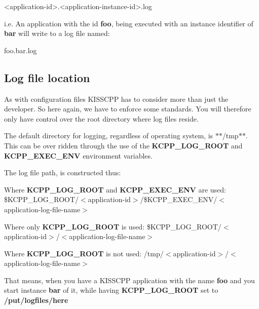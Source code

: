 \begin{DoxyCode}
<application-\textcolor{keywordtype}{id}>.<application-instance-\textcolor{keywordtype}{id}>.log
\end{DoxyCode}


i.\-e. An application with the id {\bfseries foo}, being executed with an instance identifier of {\bfseries bar} will write to a log file named\-:


\begin{DoxyCode}
foo.bar.log
\end{DoxyCode}


\subsection*{Log file location}

As with configuration files K\-I\-S\-S\-C\-P\-P has to consider more than just the developer. So here again, we have to enforce some standards. You will therefore only have control over the root directory where log files reside.

The default directory for logging, regardless of operating system, is $\ast$$\ast$/tmp$\ast$$\ast$. This can be over ridden through the use of the {\bfseries K\-C\-P\-P\-\_\-\-L\-O\-G\-\_\-\-R\-O\-O\-T} and {\bfseries K\-C\-P\-P\-\_\-\-E\-X\-E\-C\-\_\-\-E\-N\-V} environment variables.

The log file path, is constructed thus\-:


\begin{DoxyItemize}
\item Where {\bfseries K\-C\-P\-P\-\_\-\-L\-O\-G\-\_\-\-R\-O\-O\-T} and {\bfseries K\-C\-P\-P\-\_\-\-E\-X\-E\-C\-\_\-\-E\-N\-V} are used\-: \$\-K\-C\-P\-P\-\_\-\-L\-O\-G\-\_\-\-R\-O\-O\-T/$<$application-\/id$>$/\$\-K\-C\-P\-P\-\_\-\-E\-X\-E\-C\-\_\-\-E\-N\-V/$<$application-\/log-\/file-\/name$>$
\item Where only {\bfseries K\-C\-P\-P\-\_\-\-L\-O\-G\-\_\-\-R\-O\-O\-T} is used\-: \$\-K\-C\-P\-P\-\_\-\-L\-O\-G\-\_\-\-R\-O\-O\-T/$<$application-\/id$>$/$<$application-\/log-\/file-\/name$>$
\item Where {\bfseries K\-C\-P\-P\-\_\-\-L\-O\-G\-\_\-\-R\-O\-O\-T} is not used\-: /tmp/$<$application-\/id$>$/$<$application-\/log-\/file-\/name$>$
\end{DoxyItemize}

That means, when you have a K\-I\-S\-S\-C\-P\-P application with the name {\bfseries foo} and you start instance {\bfseries bar} of it, while having {\bfseries K\-C\-P\-P\-\_\-\-L\-O\-G\-\_\-\-R\-O\-O\-T} set to {\bfseries /put/logfiles/here}

